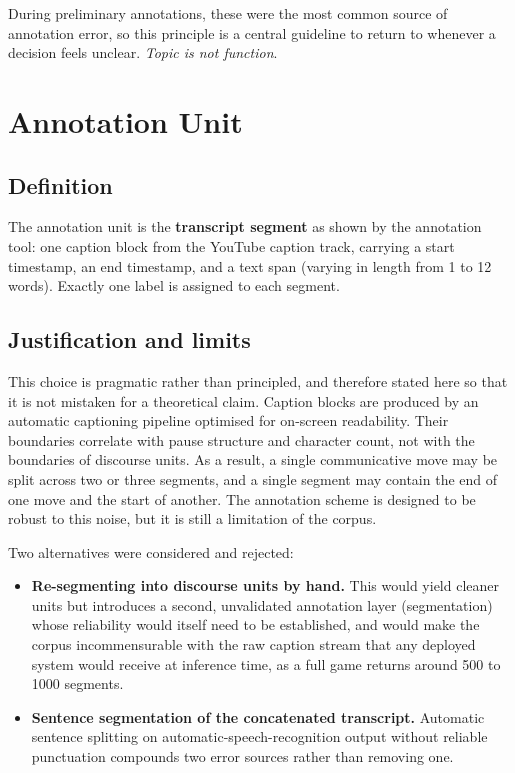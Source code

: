 \noindent During preliminary annotations, these were the most common source of annotation error, so this principle is a central guideline to return to whenever a decision feels unclear. \emph{Topic is not function}.

\section{Annotation Unit}
\label{sec:unit}

\subsection{Definition}

The annotation unit is the \textbf{transcript segment} as shown by
the annotation tool: one caption block from the YouTube caption track,
carrying a start timestamp, an end timestamp, and a text span (varying in length from 1 to 12 words). Exactly one label is assigned to each segment.

\subsection{Justification and limits}

This choice is pragmatic rather than principled, and therefore stated here so that it is not mistaken for a theoretical claim. Caption blocks are produced by an automatic captioning pipeline optimised for on-screen readability. Their boundaries correlate with pause structure and character count, not with the boundaries of discourse units. As a result, a single communicative move may be split across two or three segments, and a single segment may contain the end of one move and the start of another. The annotation scheme is designed to be robust to this noise, but it is still a limitation of the corpus.

Two alternatives were considered and rejected:

\begin{itemize}
  \item \textbf{Re-segmenting into discourse units by hand.} This would
    yield cleaner units but introduces a second, unvalidated annotation
    layer (segmentation) whose reliability would itself need to be
    established, and would make the corpus incommensurable with the raw
    caption stream that any deployed system would receive at inference
    time, as a full game returns around 500 to 1000 segments.
  \item \textbf{Sentence segmentation of the concatenated transcript.}
    Automatic sentence splitting on automatic-speech-recognition output
    without reliable punctuation compounds two error sources rather than
    removing one.
\end{itemize}

